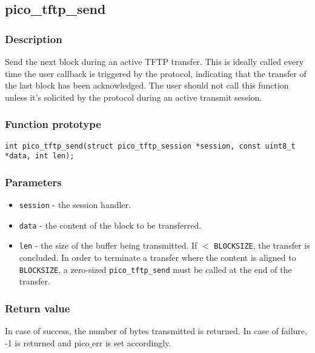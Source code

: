 
\subsection{pico\_tftp\_send}
\subsubsection*{Description}
Send the next block during an active TFTP transfer. This is ideally called every time the user callback is triggered by the protocol, indicating that the transfer of the last block has been acknowledged. The user should not call this function unless it's solicited by the protocol during an active transmit session.


\subsubsection*{Function prototype}
\begin{verbatim}
int pico_tftp_send(struct pico_tftp_session *session, const uint8_t *data, int len);
\end{verbatim}


\subsubsection*{Parameters}
\begin{itemize}[noitemsep]
\item \texttt{session} - the session handler.
\item \texttt{data} - the content of the block to be transferred.
\item \texttt{len} - the size of the buffer being transmitted. If $<$ \texttt{BLOCKSIZE}, the transfer is concluded. In order to terminate a transfer where the content is aligned to \texttt{BLOCKSIZE}, a zero-sized \texttt{pico\_tftp\_send} must be called at the end of the transfer.
\end{itemize}

\subsubsection*{Return value}
In case of success, the number of bytes transmitted is returned. In case of failure, -1 is returned and pico$\_$err is set accordingly.


